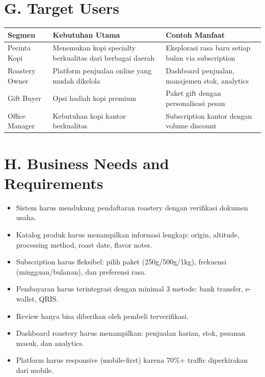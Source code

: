 \documentclass[11pt,a4paper]{article}
\begin{document}
\section{G. Target Users}
\noindent\small
\begin{tabularx}{\textwidth}{|p{2.8cm}|X|X|}
\hline
\centering\textbf{Segmen}\arraybackslash & \centering\textbf{Kebutuhan Utama}\arraybackslash & \centering\textbf{Contoh Manfaat}\arraybackslash \\\hline
Pecinta Kopi & Menemukan kopi specialty berkualitas dari berbagai daerah & Eksplorasi rasa baru setiap bulan via subscription \\\hline
Roastery Owner & Platform penjualan online yang mudah dikelola & Dashboard penjualan, manajemen stok, analytics \\\hline
Gift Buyer & Opsi hadiah kopi premium & Paket gift dengan personalisasi pesan \\\hline
Office Manager & Kebutuhan kopi kantor berkualitas & Subscription kantor dengan volume discount \\\hline
\end{tabularx}\normalsize

\section{H. Business Needs and Requirements}
\begin{itemize}[noitemsep,leftmargin=1.5cm]
\item Sistem harus mendukung pendaftaran roastery dengan verifikasi dokumen usaha.
\item Katalog produk harus menampilkan informasi lengkap: origin, altitude, processing method, roast date, flavor notes.
\item Subscription harus fleksibel: pilih paket (250g/500g/1kg), frekuensi (mingguan/bulanan), dan preferensi rasa.
\item Pembayaran harus terintegrasi dengan minimal 3 metode: bank transfer, e-wallet, QRIS.
\item Review hanya bisa diberikan oleh pembeli terverifikasi.
\item Dashboard roastery harus menampilkan: penjualan harian, stok, pesanan masuk, dan analytics.
\item Platform harus responsive (mobile-first) karena 70\%+ traffic diperkirakan dari mobile.
\end{itemize}
\end{document}
